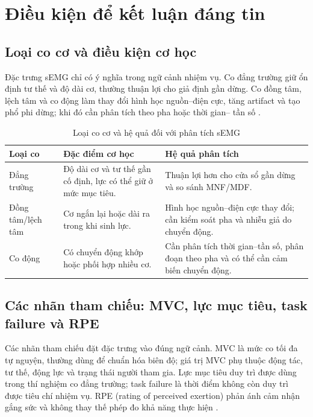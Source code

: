 \section{Điều kiện để kết luận đáng tin}
\label{sec:conditions}

\subsection{Loại co cơ và điều kiện cơ học}
\label{sec:contraction-types}

Đặc trưng sEMG chỉ có ý nghĩa trong ngữ cảnh nhiệm vụ. Co đẳng trường giữ
ổn định tư thế và độ dài cơ, thường thuận lợi cho giả định gần dừng. Co
đồng tâm, lệch tâm và co động làm thay đổi hình học nguồn--điện cực, tăng
artifact và tạo phổ phi dừng; khi đó cần phân tích theo pha hoặc thời gian--
tần số \cite{mcmanus2020analysis,knaflitz1999time}.

\begin{table}[htbp]
\centering
\caption{Loại co cơ và hệ quả đối với phân tích sEMG}
\label{tab:contraction-types}
\begin{tabularx}{\textwidth}{@{}P{3.1cm}Y Y@{}}
\toprule
\textbf{Loại co} & \textbf{Đặc điểm cơ học} & \textbf{Hệ quả phân tích} \\
\midrule
Đẳng trường & Độ dài cơ và tư thế gần cố định, lực có thể giữ ở mức mục tiêu. & Thuận lợi hơn cho cửa sổ gần dừng và so sánh MNF/MDF. \\
Đồng tâm/lệch tâm & Cơ ngắn lại hoặc dài ra trong khi sinh lực. & Hình học nguồn--điện cực thay đổi; cần kiểm soát pha và nhiễu giả do chuyển động. \\
Co động & Có chuyển động khớp hoặc phối hợp nhiều cơ. & Cần phân tích thời gian--tần số, phân đoạn theo pha và có thể cần cảm biến chuyển động. \\
\bottomrule
\end{tabularx}
\end{table}

\subsection{Các nhãn tham chiếu: MVC, lực mục tiêu, task failure và RPE}
\label{sec:reference-labels}

Các nhãn tham chiếu đặt đặc trưng vào đúng ngữ cảnh. MVC là mức co tối đa
tự nguyện, thường dùng để chuẩn hóa biên độ; giá trị MVC phụ thuộc động
tác, tư thế, động lực và trạng thái người tham gia. Lực mục tiêu duy trì
được dùng trong thí nghiệm co đẳng trường; task failure là thời điểm không
còn duy trì được tiêu chí nhiệm vụ. RPE (rating of perceived exertion)
phản ánh cảm nhận gắng sức và không thay thế phép đo khả năng thực hiện
\cite{enoka2016translating}.

